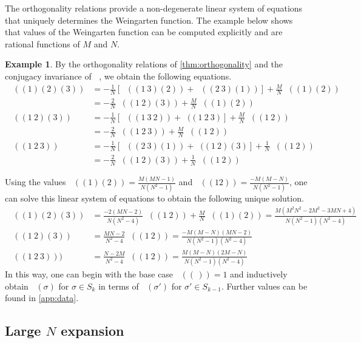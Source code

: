 \documentclass[a4paper]{article}
\theoremstyle{plain}
\numberwithin{theorem}{section}
\theoremstyle{definition}
\newtheorem{example}[theorem]{Example}
\theoremstyle{remark}
\newcommand{\SM}{\mathbf{S}}			%
\DeclareMathOperator{\SW}{Wg^{\SM}}		%
\newcommand{\SG}{S} 					%
\begin{document}
The orthogonality relations provide a non-degenerate linear system of equations that uniquely determines the Weingarten function. The example below shows that values of the Weingarten function can be computed explicitly and are rational functions of $M$ and $N$.


\begin{example} \label{ex:weingarten}
By the orthogonality relations of \cref{thm:orthogonality} and the conjugacy invariance of $\SW$, we obtain the following equations.
\begin{align*}
\SW((1)(2)(3)) &= -\frac{1}{N} \left[ \SW((1~3)(2)) + \SW((2~3)(1)) \right] + \frac{M}{N} \SW((1)(2)) \\
&= -\frac{2}{N} \SW((1~2)(3)) + \frac{M}{N} \SW((1)(2)) \\
\SW((1~2)(3)) &= -\frac{1}{N} \left[ \SW((1~3~2)) + \SW((1~2~3) \right] + \frac{M}{N} \SW((1~2)) \\
&= -\frac{2}{N} \SW((1~2~3)) + \frac{M}{N}\SW((1~2)) \\
\SW((1~2~3)) &= -\frac{1}{N} \left[ \SW((2~3)(1)) + \SW((1~2)(3) \right] + \frac{1}{N} \SW((1~2)) \\
&= -\frac{2}{N} \SW((1~2)(3)) + \frac{1}{N} \SW((1~2))
\end{align*}


Using the values $\SW((1)(2)) = \frac{M(MN-1)}{N (N^2-1)}$ and $\SW((12)) = \frac{-M(M - N)}{N (N^2-1)}$, one can solve this linear system of equations to obtain the following unique solution.
\begin{align*}
\SW((1)(2)(3)) &= \frac{-2(MN-2)}{N(N^2-4)} \SW((1~2)) + \frac{M}{N} \SW((1)(2)) = \frac{M(M^2N^2 - 2M^2 - 3MN + 4)}{N (N^2-1) (N^2-4)} \\
\SW((1~2)(3)) &= \frac{MN-2}{N^2-4} \SW((1~2)) = \frac{-M (M-N) (MN-2)}{N (N^2-1) (N^2-4)} \\
\SW((1~2~3))) &=\frac{N-2M}{N^2-4}\SW((1~2)) = \frac{M (M-N) (2M-N)}{N (N^2-1) (N^2-4)}
\end{align*}
In this way, one can begin with the base case $\SW((\,)) = 1$ and inductively obtain $\SW(\sigma)$ for $\sigma\in\SG_k$ in terms of $\SW(\sigma')$ for $\sigma'\in\SG_{k-1}$. Further values can be found in \cref{app:data}.
\end{example}



\subsection{Large \texorpdfstring{$N$}{N} expansion}
\end{document}
